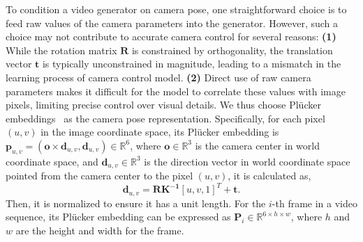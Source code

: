 To condition a video generator on camera pose, one straightforward choice is to feed raw values of the camera parameters into the generator.
%
However, such a choice may not contribute to accurate camera control for several reasons: \textbf{(1)} While the rotation matrix $\mathbf{R}$ is constrained by orthogonality, the translation vector $\mathbf{t}$ is typically unconstrained in magnitude, leading to a mismatch in the learning process of camera control model.
%
\textbf{(2)}  Direct use of raw camera parameters makes it difficult for the model to correlate these values with image pixels, limiting precise control over visual details.
%
We thus choose Plücker embeddings~\citep{lfn} as the camera pose representation. 
%
Specifically, for each pixel $(u, v)$ in the image coordinate space, its Plücker embedding is $\mathbf{p}_{u, v} = (\mathbf{o} \times \mathbf{d}_{u, v}, \mathbf{d}_{u, v})\in \mathbb{R}^6$, where $\mathbf{o}\in \mathbb{R}^3 $ is the camera center in world coordinate space, and $\mathbf{d}_{u, v} \in \mathbb{R}^3$ is the direction vector in world coordinate space pointed from the camera center to the pixel $(u, v)$, it is calculated as,
\begin{equation}
    \label{equ: pluckeremb}
	\mathbf{d}_{u, v} = \mathbf{RK^{-1}}[u, v, 1]^T + \mathbf{t}.
\end{equation} 
%
Then, it is normalized to ensure it has a unit length. For the $i$-th frame in a video sequence, its Plücker embedding can be expressed as $\mathbf{P}_i \in \mathbb{R}^{6 \times h \times w}$, where $h$ and $w$ are the height and width for the frame.

